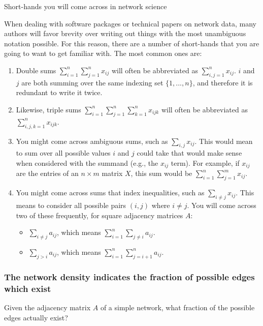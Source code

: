 \begin{floatingbox}[h]\caption{Short-hands you will come across in network science}
\label{box:ch4:sums}
When dealing with software packages or technical papers on network data, many authors will favor brevity over writing out things with the most unambiguous notation possible. For this reason, there are a number of short-hands that you are going to want to get familiar with. The most common ones are:
\begin{enumerate}
    \item Double sums $\sum_{i = 1}^n \sum_{j = 1}^n x_{ij}$ will often be abbreviated as $\sum_{i, j = 1}^nx_{ij}$. $i$ and $j$ are both summing over the same indexing set $\{1, ..., n\}$, and therefore it is redundant to write it twice.
    \item Likewise, triple sums $\sum_{i = 1}^n \sum_{j = 1}^n \sum_{k = 1}^n x_{ijk}$ will often be abbreviated as $\sum_{i,j,k = 1}^nx_{ijk}$.
    \item You might come across ambiguous sums, such as $\sum_{i,j}x_{ij}$. This would mean to sum over all possible values $i$ and $j$ could take that would make sense when considered with the summand (e.g., the $x_{ij}$ term). For example, if $x_{ij}$ are the entries of an $n \times m$ matrix $X$, this sum would be $\sum_{i = 1}^n \sum_{j = 1}^m x_{ij}$. 
    \item You might come across sums that index inequalities, such as $\sum_{i \neq j}x_{ij}$. This means to consider all possible pairs $(i, j)$ where $i \neq j$. You will come across two of these frequently, for square adjacency matrices $A$:
    \begin{itemize}
        \item $\sum_{i \neq j} a_{ij}$, which means $\sum_{i = 1}^n \sum_{j \neq i}a_{ij}$.
        \item $\sum_{j > i} a_{ij}$, which means $\sum_{i = 1}^n \sum_{j = i + 1}^n a_{ij}$.
    \end{itemize}
\end{enumerate}
\end{floatingbox}


\subsubsection{The network density indicates the fraction of possible edges which exist}
\label{sec:ch4:prop-net:density}
Given the adjacency matrix $A$ of a simple network, what fraction of the possible edges {actually} exist? 


